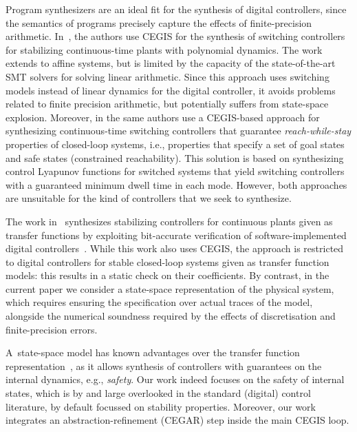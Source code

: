 \documentclass[twocolumn]{autart}    %
\begin{document}

Program synthesizers are an ideal fit for the synthesis of digital controllers, since
the semantics of programs precisely capture the effects of finite-precision arithmetic.  
In~\cite{DBLP:conf/cdc/RavanbakhshS15}, the authors use CEGIS 
for the synthesis of switching controllers for stabilizing continuous-time
plants with polynomial dynamics.  The work extends to affine systems, but is
limited by the capacity of the state-of-the-art SMT solvers for solving
linear arithmetic.  Since this approach uses switching models instead of
linear dynamics for the digital controller, it avoids problems related to
finite precision arithmetic, but potentially suffers from state-space
explosion.  Moreover, in \cite{DBLP:conf/emsoft/RavanbakhshS16} the same
authors use a CEGIS-based approach for synthesizing continuous-time
switching controllers that guarantee \emph{reach-while-stay} properties of
closed-loop systems, i.e., properties that specify a set of goal states and
safe states (constrained reachability).  This solution is based on
synthesizing control Lyapunov functions for switched systems that yield
switching controllers with a guaranteed minimum dwell time in each mode. 
However, both approaches are unsuitable for the kind of controllers that we seek to
synthesize.

The work in~\cite{hscc-paper} synthesizes stabilizing controllers for
continuous plants given as transfer functions by exploiting bit-accurate
verification of software-implemented digital controllers~\cite{Bessa16}. 
While this work also uses CEGIS, the approach is restricted to digital
controllers for stable closed-loop systems given as transfer function
models: this results in a static check on their coefficients.  By contrast,
in the current paper we consider a state-space representation of the
physical system, which requires ensuring the specification over actual
traces of the model, alongside the numerical soundness required by the
effects of discretisation and finite-precision errors.

A~state-space model has known advantages over the transfer function
representation~\cite{Franklin15}, as 
it allows synthesis of controllers with guarantees on the internal dynamics, e.g., 
\emph{safety}.  Our work indeed focuses on the safety of internal states, 
which is by and large overlooked in the standard (digital) control literature, 
by default focussed on stability properties.  
Moreover, our work integrates an abstraction-refinement (CEGAR) step inside the main CEGIS loop.
\end{document}
